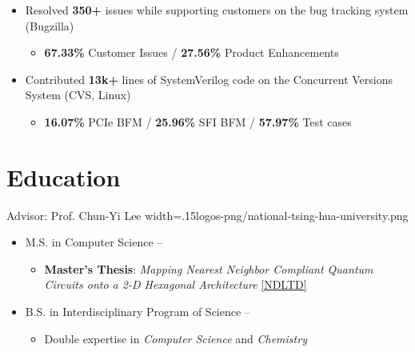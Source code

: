 \documentclass{cvclass}
\newcommand{\simplemmyy}[3]{\shortmmyyformat\formatdate{#3}{#2}{#1}}
\begin{document}
{\begin{itemize}
\begin{itemize}
            \item Develop the functionality to align with the latest specification.
        \end{itemize}
        \item Resolved \textbf{350+} issues while supporting customers on the bug tracking system (Bugzilla)
        \begin{itemize}
            \item {\textbf{67.33\%} Customer Issues / \textbf{27.56\%} Product Enhancements}
        \end{itemize}
        \item Contributed \textbf{13k+} lines of SystemVerilog code on the Concurrent Versions System (CVS, Linux)
        \begin{itemize}
            \item \textbf{16.07\%} PCIe BFM / \textbf{25.96\%} SFI BFM / \textbf{57.97\%} Test cases
        \end{itemize}
    \end{itemize}}


\section{Education}

        {Advisor: Prof. Chun-Yi Lee}
        {width=.15\linewidth}{logos-png/national-tsing-hua-university.png}{
    \begin{itemize}
        \item M.S. in Computer Science -- \textit{\simplemmyy{2021}{6}{30}} %
        \begin{itemize}
            \item \textbf{Master’s Thesis}: \textit{Mapping Nearest Neighbor Compliant Quantum Circuits onto a 2-D Hexagonal Architecture} \href{https://hdl.handle.net/11296/dpttkc}{[NDLTD]}
        \end{itemize}
        \item B.S. in Interdisciplinary Program of Science -- \textit{\simplemmyy{2017}{6}{30}} %
        \begin{itemize}
            \item Double expertise in \textit{Computer Science} and \textit{Chemistry}
        \end{itemize}
    \end{itemize}}


\makepublications
\end{document}
